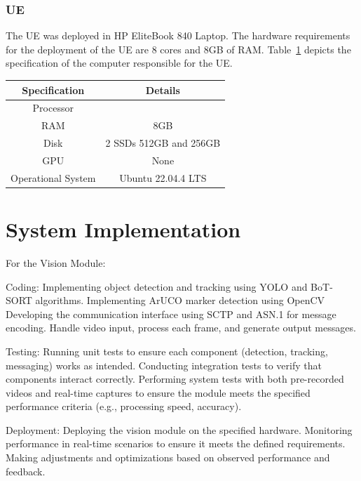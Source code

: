 \subsubsection{UE}
The UE was deployed in HP EliteBook 840 Laptop.
The hardware requirements for the deployment of the UE are 8 cores and 8GB of RAM\@.
Table~\ref{tab:specs_pc_ue} depicts the specification of the computer responsible for the UE\@.

\begin{table}[H]
    \begin{tabular}{|c|c|}
        \hline
        \textbf{Specification} & \textbf{Details} \\ \hline
        Processor                      &              \\ \hline
        RAM                      &          8GB        \\ \hline
        Disk                      &   2 SSDs  512GB and 256GB         \\ \hline
        GPU                     &   None                \\ \hline
        Operational System & Ubuntu 22.04.4 LTS                  \\ \hline  %
    \end{tabular}\label{tab:specs_pc_ue}
\end{table}


\section{System Implementation}\label{sec:impl}

For the Vision Module:

    Coding:
        Implementing object detection and tracking using YOLO and BoT-SORT algorithms.
        Implementing ArUCO marker detection using OpenCV
        Developing the communication interface using SCTP and ASN.1 for message encoding.
        Handle video input, process each frame, and generate output messages.

    Testing:
        Running unit tests to ensure each component (detection, tracking, messaging) works as intended.
        Conducting integration tests to verify that components interact correctly.
        Performing system tests with both pre-recorded videos and real-time captures to ensure the module meets the specified performance criteria (e.g., processing speed, accuracy).

    Deployment:
        Deploying the vision module on the specified hardware.
        Monitoring performance in real-time scenarios to ensure it meets the defined requirements.
        Making adjustments and optimizations based on observed performance and feedback.

